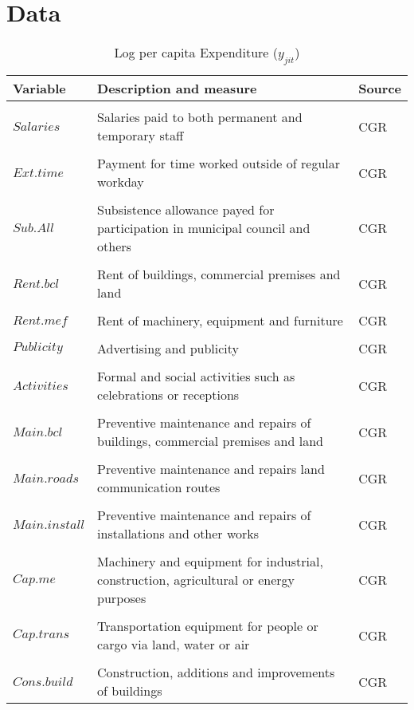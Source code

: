 \section{Data}

\begin{table}[ht]
\caption{Log per capita Expenditure ($y_{jit}$)}
\centering
\begin{tabular}{l l l}
\hline\hline
Variable & Description and measure & Source \\ [0.5ex] 
\hline
\\
$Salaries$ & Salaries paid to both permanent and temporary staff & CGR\\
\\
$Ext.time$ & Payment for time worked outside of regular workday & CGR\\
\\
$Sub.All$ & Subsistence allowance payed for participation in municipal council and others & CGR\\
\\
$Rent.bcl$ & Rent of buildings, commercial premises and land & CGR\\
\\
$Rent.mef$ & Rent of machinery, equipment and furniture & CGR\\
\\
$Publicity$ & Advertising and publicity & CGR\\
\\
$Activities$ & Formal and social activities such as celebrations or receptions  & CGR\\
\\
$Main.bcl$ & Preventive maintenance and repairs of buildings, commercial premises and land  & CGR\\
\\
$Main.roads$ & Preventive maintenance and repairs land communication routes  & CGR\\
\\
$Main.install$ & Preventive maintenance and repairs of installations and other works & CGR\\
\\
$Cap.me$ & Machinery and equipment for industrial, construction, agricultural or energy purposes & CGR\\
\\
$Cap.trans$ & Transportation equipment for people or
cargo via land, water or air & CGR\\
\\
$Cons.build$ & Construction, additions and improvements of buildings  & CGR\\

\end{tabular}
\end{table}
